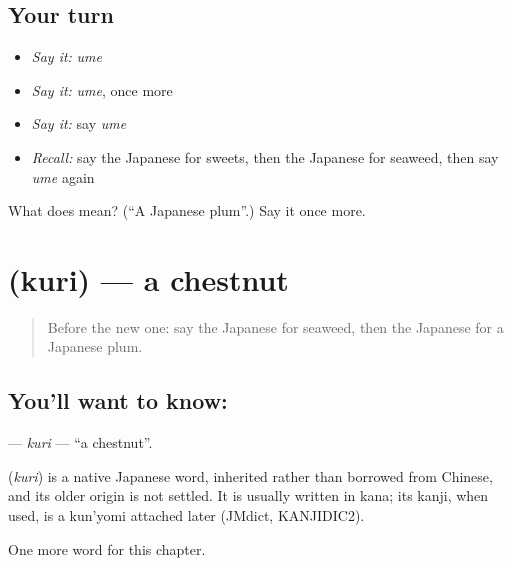 \subsection*{Your turn}
\begin{itemize}
\raggedright
  \item \emph{Say it:} \emph{ume}
  \item \emph{Say it:} \emph{ume}, once more
  \item \emph{Say it:} say \emph{ume}
  \item \emph{Recall:} say the Japanese for sweets, then the Japanese for seaweed, then say \emph{ume} again
\end{itemize}

\begin{tcolorbox}[breakable,colback=teal!4,colframe=teal!35!black,title={Before you move on}]
What does  mean? (\textquotedblleft{}A Japanese plum\textquotedblright{}.) Say it once more.
\end{tcolorbox}
\section[\texorpdfstring{\ja{くり} (kuri)}{くり (kuri)}]{ (kuri) — a chestnut}

\label{lesson:JA-C36-kuri}



\begin{quote}
Before the new one: say the Japanese for seaweed, then the Japanese for a Japanese plum.
\end{quote}

\subsection*{You'll want to know: }
\textbf{} — \emph{kuri} — \textquotedblleft{}a chestnut\textquotedblright{}.

\begin{cousinweb}
\textbf{} (\emph{kuri}) is a native Japanese word, inherited rather than borrowed from Chinese, and its older origin is not settled. It is usually written in kana; its kanji, when used, is a kun'yomi attached later (JMdict, KANJIDIC2).
\end{cousinweb}

\begin{grammarlens}[title={What you've built}]
One more word for this chapter.
\end{grammarlens}

